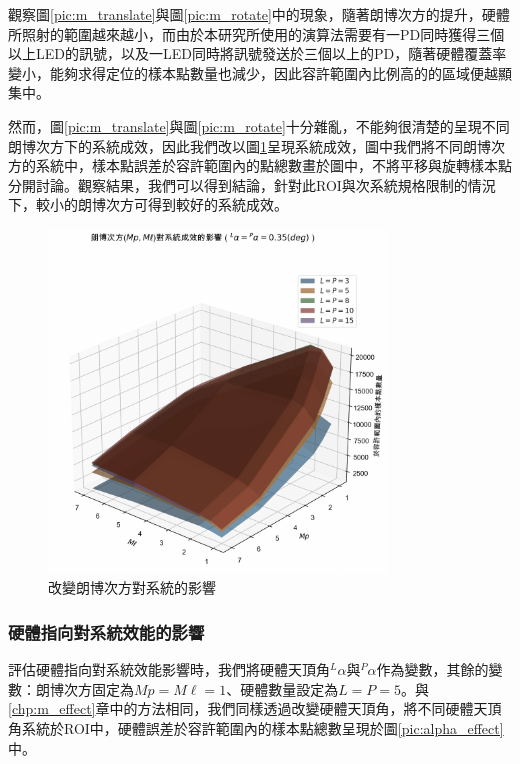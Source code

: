 觀察圖\ref{pic:m_translate}與圖\ref{pic:m_rotate}中的現象，隨著朗博次方的提升，硬體所照射的範圍越來越小，而由於本研究所使用的演算法需要有一PD同時獲得三個以上LED的訊號，以及一LED同時將訊號發送於三個以上的PD，隨著硬體覆蓋率變小，能夠求得定位的樣本點數量也減少，因此容許範圍內比例高的的區域便越顯集中。



然而，圖\ref{pic:m_translate}與圖\ref{pic:m_rotate}十分雜亂，不能夠很清楚的呈現不同朗博次方下的系統成效，因此我們改以圖\ref{pic:m_effect}呈現系統成效，圖中我們將不同朗博次方的系統中，樣本點誤差於容許範圍內的點總數畫於圖中，不將平移與旋轉樣本點分開討論。觀察結果，我們可以得到結論，針對此ROI與次系統規格限制的情況下，較小的朗博次方可得到較好的系統成效。

\begin{figure}[htpb]
    \centering
    \includegraphics[width=9cm]{ch4pic/m_effect.png}
    \caption{改變朗博次方對系統的影響}
    \label{pic:m_effect}
\end{figure}








\subsubsection{硬體指向對系統效能的影響}
\label{chp:orient_effect}

評估硬體指向對系統效能影響時，我們將硬體天頂角$^L\alpha$與$^P\alpha$作為變數，其餘的變數：朗博次方固定為$Mp=M\ell=1$、硬體數量設定為$L=P=5$。與\ref{chp:m_effect}章中的方法相同，我們同樣透過改變硬體天頂角，將不同硬體天頂角系統於ROI中，硬體誤差於容許範圍內的樣本點總數呈現於圖\ref{pic:alpha_effect}中。



